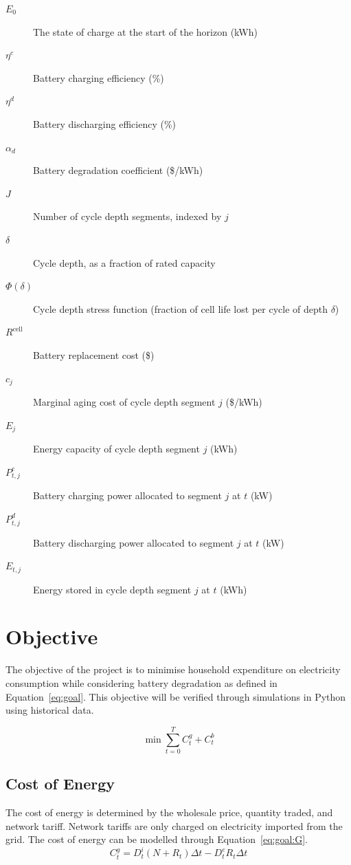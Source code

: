 \begin{description}
    \item[$E_0$] The state of charge at the start of the horizon (kWh)
    \item[$\eta^c$] Battery charging efficiency (\%)
    \item[$\eta^d$] Battery discharging efficiency (\%)
    \item[$\alpha_d$] Battery degradation coefficient (\$/kWh)
  \item[$J$] Number of cycle depth segments, indexed by $j$
  \item[$\delta$] Cycle depth, as a fraction of rated capacity
  \item[$\Phi(\delta)$] Cycle depth stress function (fraction of cell life lost per cycle of depth $\delta$)
  \item[$R^{\text{cell}}$] Battery replacement cost (\$)
  \item[$c_j$] Marginal aging cost of cycle depth segment $j$ (\$/kWh)
  \item[$E_j$] Energy capacity of cycle depth segment $j$ (kWh)
  \item[$P^{c}_{t,j}$] Battery charging power allocated to segment $j$ at $t$ (kW)
  \item[$P^{d}_{t,j}$] Battery discharging power allocated to segment $j$ at $t$ (kW)
  \item[$E_{t,j}$] Energy stored in cycle depth segment $j$ at $t$ (kWh)

\end{description}

\section{Objective}
The objective of the project is to minimise household expenditure on electricity consumption while considering battery degradation as defined in Equation~\ref{eq:goal}. This objective will be verified through simulations in Python using historical data.


\begin{equation}
    \label{eq:goal}
    \min \sum_{t=0}^{T} C^g_t+C^b_t
\end{equation}

\subsection{Cost of Energy}
The cost of energy is determined by the wholesale price, quantity traded, and network tariff. Network tariffs are only charged on electricity imported from the grid. The cost of energy can be modelled through Equation~\ref{eq:goal:G}.
\begin{equation}
    \label{eq:goal:G}
    C^g_t = D^i_t(N+R_t)\Delta t - D_t^e R_t\Delta t
\end{equation}

